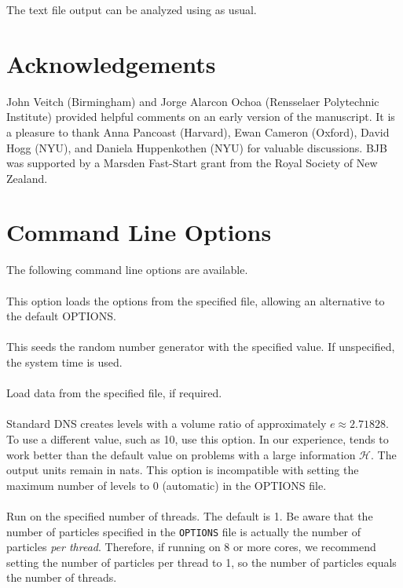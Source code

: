\documentclass[article, nojss]{jss}
\begin{document}
The text file output can be analyzed using 
as usual.

\section*{Acknowledgements}
John Veitch (Birmingham)
and Jorge Alarcon Ochoa (Rensselaer Polytechnic Institute)
provided helpful comments on an early
version of the manuscript.
It is a pleasure to thank Anna Pancoast (Harvard),
Ewan Cameron (Oxford), David Hogg (NYU), and Daniela Huppenkothen (NYU)
for valuable discussions. BJB was supported by a Marsden Fast-Start grant
from the Royal Society of New Zealand.



\appendix
\section{Command Line Options}\label{sec:command_line_options}
The following command line options are available.\\

\\
This option loads the  options from the specified file, allowing
an alternative to the default OPTIONS.\\

\\
This seeds the random number generator with the specified value. If unspecified, the system time is used.\\

\\
Load data from the specified file, if required.\\

\\
Standard DNS creates levels with a volume ratio of approximately
$e\approx 2.71828$. To use a different value, such as 10, use this option.
In our experience,  tends to work better than the default
value on problems with a large information $\mathcal{H}$.
The output units remain in nats.
This option is incompatible with setting the maximum number of levels to 0
(automatic) in the OPTIONS file.
\\

\\
Run on the specified number of threads. The default is 1.
Be aware that the number of particles specified in the {\tt OPTIONS}
file is actually the number of particles {\em per thread}. Therefore,
if running on 8 or more cores, we recommend setting the number of particles
per thread to 1, so the number of particles equals the number of threads.
\end{document}
